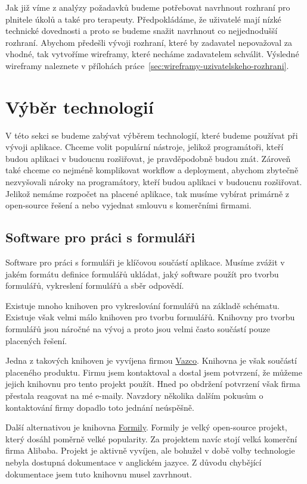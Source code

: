 Jak již víme z analýzy požadavků budeme potřebovat navrhnout rozhraní pro plnitele úkolů a také pro terapeuty.
Předpokládáme, že uživatelé mají nízké technické dovednosti a proto se budeme snažit navrhnout co nejjednodušší rozhraní.
Abychom předešli vývoji rozhraní, které by zadavatel nepovažoval za vhodné, tak vytvoříme wireframy, které necháme zadavatelem schválit.
Výsledné wireframy naleznete v přílohách práce\ \ref{sec:wireframy-uzivatelskeho-rozhrani}.

\section{Výběr technologií}\label{sec:vyber-technologii}

V této sekci se budeme zabývat výběrem technologií, které budeme používat při vývoji aplikace.
Chceme volit populární nástroje, jelikož programátoři, kteří budou aplikaci v budoucnu rozšiřovat, je pravděpodobně budou znát.
Zároveň také chceme co nejméně komplikovat workflow a deployment, abychom zbytečně nezvyšovali nároky na programátory, kteří budou aplikaci v budoucnu rozšiřovat.
Jelikož nemáme rozpočet na placené aplikace, tak musíme vybírat primárně z open-source řešení a nebo vyjednat smlouvu s komerčními firmami.

\subsection{Software pro práci s formuláři}\label{subsec:software-pro-praci-s-formulari}

Software pro práci s formuláři je klíčovou součástí aplikace.
Musíme zvážit v jakém formátu definice formulářů ukládat, jaký software použít pro tvorbu formulářů, vykreslení formulářů a sběr odpovědí.

Existuje mnoho knihoven pro vykreslování formulářů na základě schématu.
Existuje však velmi málo knihoven pro tvorbu formulářů.
Knihovny pro tvorbu formulářů jsou náročné na vývoj a proto jsou velmi často součástí pouze placených řešení.

Jedna z takových knihoven je vyvíjena firmou \href{https://www.vazco.eu/}{Vazco}.
Knihovna je však součástí placeného produktu.
Firmu jsem kontaktoval a dostal jsem potvrzení, že můžeme jejich knihovnu pro tento projekt použít.
Hned po obdržení potvrzení však firma přestala reagovat na mé e-maily.
Navzdory několika dalším pokusům o kontaktování firmy dopadlo toto jednání neúspěšně.

Další alternativou je knihovna \href{https://formilyjs.org/}{Formily}.
Formily je velký open-source projekt, který dosáhl poměrně velké popularity.
Za projektem navíc stojí velká komerční firma Alibaba.
Projekt je aktivně vyvíjen, ale bohužel v době volby technologie nebyla dostupná dokumentace v anglickém jazyce.
Z důvodu chybějící dokumentace jsem tuto knihovnu musel zavrhnout.

